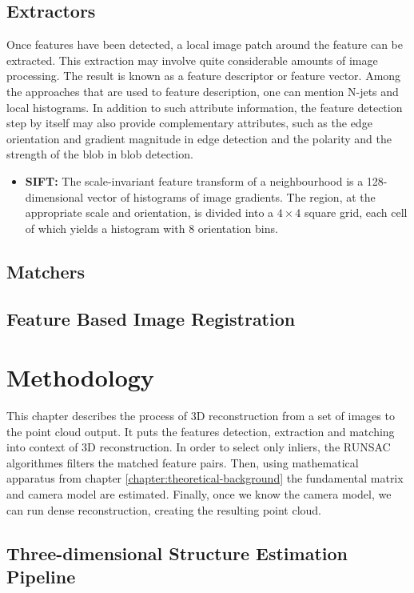 \section{Extractors}
\label{sec:extractors}
Once features have been detected, a local image patch around the feature can be extracted. This extraction may involve quite considerable amounts of image processing. The result is known as a feature descriptor or feature vector. Among the approaches that are used to feature description, one can mention N-jets and local histograms. In addition to such attribute information, the feature detection step by itself may also provide complementary attributes, such as the edge orientation and gradient magnitude in edge detection and the polarity and the strength of the blob in blob detection.

\begin{itemize}
	\item \textbf{SIFT:} The scale-invariant feature transform of a neighbourhood is a 128-dimensional vector of histograms of image gradients. The region, at the appropriate scale and orientation, is divided into a $4\times 4$ square grid, each cell of which yields a histogram with 8 orientation bins.
\end{itemize}
\section{Matchers}
\label{sec:matchers}

\section{Feature Based Image Registration}

\chapter{Methodology}
\label{chapter:methodology}
This chapter describes the process of 3D reconstruction from a set of images to the point cloud output. It puts the features detection, extraction and matching into context of 3D reconstruction. In order to select only inliers, the RUNSAC algorithmes filters the matched feature pairs. Then, using mathematical apparatus from chapter \ref{chapter:theoretical-background} the fundamental matrix and camera model are estimated. Finally, once we know the camera model, we can run dense reconstruction, creating the resulting point cloud.  
\section{Three-dimensional Structure Estimation Pipeline}
